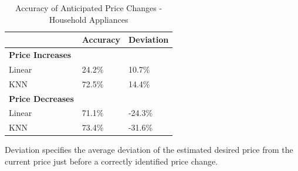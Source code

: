 \documentclass[11pt]{article}
\begin{document}
\begin{table}[ht]
    \centering
        \caption{Accuracy of Anticipated Price Changes - Household Appliances}
        \vspace{.5cm}
    \begin{tabular}{l | l  l } 
 \hline
  \textbf{} & \textbf{Accuracy} & \textbf{Deviation}  \\ [0.5ex] 
 \hline\hline
 \textbf{Price Increases} \\
 Linear & 24.2\% & 10.7\%    \\
   KNN & 72.5\%  & 14.4\%  \\
  \hline
   \textbf{Price Decreases} \\
 Linear & 71.1\% &  -24.3\%  \\
   KNN & 73.4\% &  -31.6\%  \\
  \hline
\end{tabular}
\begin{tablenotes}\footnotesize
\item Deviation specifies the average deviation of the estimated desired price from the current price just before a correctly identified price change.
\end{tablenotes}
\end{table}
\end{document}
